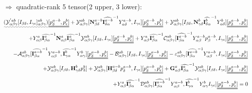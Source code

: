 \documentclass{Note}
\begin{document}
$\Rightarrow$ quadratic-rank 5 tensor(2 upper, 3 lower):
\begin{equation}
\begin{aligned}
\uwave{(\mathcal{Y}_{\alpha\beta\gamma}^{'ab}[I_{\beta\delta},I_{\gamma\epsilon}]_{\alpha\beta\gamma}^{ab})}
\uuline{[p_{\delta}^{a-b}, p_{\epsilon}^{b}]}+\mathcal{Y}_{\alpha\beta\gamma}^{ab}[\textbf{N}_{\beta\delta}^{a-b} {\widehat{\textbf{I}_{\delta \alpha}^{a-b}}}^{-1}  Y_{\alpha\delta}^{a-b} ,I_{\gamma\epsilon} ]\uuline{[p_{\delta}^{a-b}, p_{\epsilon}^{b}]}+\mathcal{Y}_{\alpha\beta\gamma}^{ab}[I_{\beta\delta},\textbf{N}_{\gamma\delta}^{b} {\widehat{\textbf{I}_{\delta \alpha}^{b}}}^{-1}  Y_{\alpha\delta}^{b} ]\uuline{[p_{\delta}^{a-b}, p_{\epsilon}^{b}]}\\
+Y_{\alpha\beta}^{a} {\widehat{\textbf{I}_{\beta \alpha}^a}}^{-1}   \textbf{N}_{\alpha\beta}^a {\widehat{\textbf{I}_{\beta \alpha}^a}}^{-1} \mathcal{Y}_{\alpha\beta\gamma}^{ab}[I_{\beta\delta},I_{\gamma\epsilon} ]\uuline{[p_{\delta}^{a-b}, p_{\epsilon}^{b}] }+Y_{\alpha\beta}^{a}{\widehat{\textbf{I}_{\beta \alpha}^a}}^{-1}  \mathcal{C}_{\alpha\beta\gamma}^{ab}[{\widehat{\textbf{I}_{\beta \alpha}^{a-b}}}^{-1}  Y_{\alpha\beta}^{a-b} p_\beta^{a-b} ,I_{\gamma\epsilon} ]\uuline{[p_{\delta}^{a-b}, p_{\epsilon}^{b}]}\\
-\mathcal{A}_{\alpha\beta\gamma}^{ab}[{\widehat{\textbf{I}_{\beta \alpha}^{a-b}}}^{-1}  Y_{\alpha\beta}^{a-b} ,{\widehat{\textbf{I}_{\gamma \alpha}^{b}}}^{-1}  Y_{\alpha\gamma}^{b} ]\uuline{[p_{\delta}^{a-b}, p_{\epsilon}^{b}]} -\mathcal{B}_{\alpha\beta\gamma}^{ab}[I_{\beta\delta},I_{\gamma\epsilon} ]\uuline{[p_{\delta}^{a-b}, p_{\epsilon}^{b}]}-\varepsilon_{\alpha\beta\gamma}^{ab}[{\widehat{\textbf{I}_{\beta \alpha}^{a-b}}}^{-1}  Y_{\alpha\beta}^{a-b}  ,I_{\gamma\epsilon} ]\uuline{[p_{\delta}^{a-b}, p_{\epsilon}^{b}]}\\
+\mathcal{Y}_{\alpha\beta\gamma}^{ab}[I_{\beta\delta},\textbf{H}_{\gamma\delta}^{b} p_{\delta}^{b}]+\mathcal{Y}_{\alpha\beta\gamma}^{ab}[\textbf{H}_{\beta\delta}^{a-b} p_{\delta}^{a-b},I_{\gamma\epsilon} ]\uuline{[p_{\delta}^{a-b}, p_{\epsilon}^{b}]}+\textbf{G}_{\alpha\beta}^a  {\widehat{\textbf{I}_{\beta \alpha}^a}}^{-1} \mathcal{Y}_{\alpha\beta\gamma}^{ab}[I_{\beta\delta},I_{\gamma\epsilon} ] \uuline{[p_{\delta}^{a-b}, p_{\epsilon}^{b}]}\\
+Y_{\alpha\beta}^{a} {\widehat{\textbf{I}_{\beta \alpha}^a}}^{-1}  \mathcal{D}_{\alpha\beta\gamma}^{ab}[{\widehat{\textbf{I}_{\beta \alpha}^{a-b}}}^{-1}  Y_{\alpha\beta}^{a-b} ,{\widehat{\textbf{I}_{\gamma \alpha}^{b}}}^{-1}  Y_{\alpha\gamma}^{b} I_{\gamma\epsilon} ]\uuline{[p_{\delta}^{a-b}, p_{\epsilon}^{b}]}=0
\end{aligned}
\end{equation}
\end{document}
